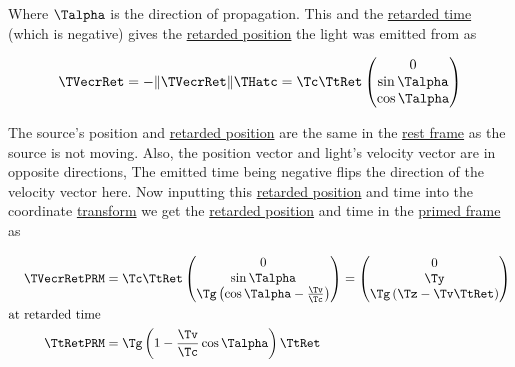 Where ${\Talpha }$ is the direction of propagation.
This and the \hyperlink{def-retarded-time}{retarded time} (which is negative) gives the \hyperlink{def-retarded-position}{retarded position} the light was emitted from as

\begin{equation}
	\TVecrRet  = -\|\TVecrRet \|\THatc  ={\Tc }{ { \TtRet  } }
	\begin{pmatrix}
		0            \\
		\sin{\Talpha } \\
		\cos{\Talpha } \\
	\end{pmatrix}
\end{equation}

The source's position and \hyperlink{def-retarded-position}{retarded position} are the same in the \hyperlink{def-proper-frame}{rest frame} as the source is not moving.
Also, the position vector and light's velocity vector are in opposite directions, The emitted time being negative flips the direction of the velocity vector here.
Now inputting this \hyperlink{def-retarded-position}{retarded position} and time into the coordinate \hyperlink{def-transform}{transform} we get the \hyperlink{def-retarded-position}{retarded position} and time in the \hyperlink{def-Primed-Frame}{primed frame} as

\begin{equation}
	\begin{aligned}
		\TVecrRetPRM      & = {\Tc }{ \TtRet  }
		\begin{pmatrix}
			0                                                \\
			\sin{\Talpha }                                     \\
			{\Tg } \left( \cos{\Talpha }-\frac{\Tv }{\Tc } \right) \\
		\end{pmatrix}
		=
		\begin{pmatrix}
			0                                             \\
			{\Ty }                                           \\
			{\Tg } \left( {\Tz }-{\Tv } { { \TtRet  } } \right) \\
		\end{pmatrix}
		\\
		\text{at retarded time } &
		\\ { \TtRetPRM  } & = \Tg  \left(1-\frac{\Tv }{\Tc } \cos{\Talpha } \right) { { \TtRet  } }
	\end{aligned}
\end{equation}

